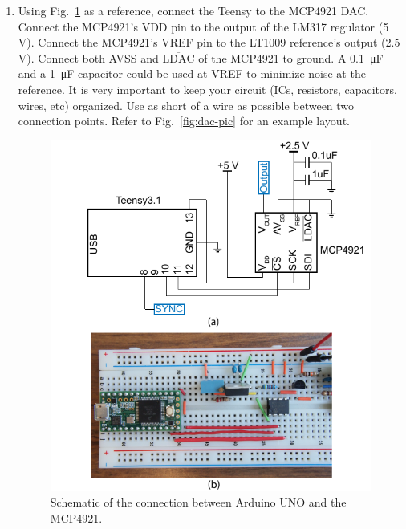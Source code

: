\documentclass[letterpaper, 11pt]{article}
\begin{document}
\begin{enumerate}
	\item Using Fig.~\ref{fig:dac-sch} as a reference, connect the Teensy to the MCP4921 DAC. Connect the MCP4921's VDD pin to the output of the LM317 regulator (5\,V). Connect the MCP4921's VREF pin to the LT1009 reference's output (2.5\,V). Connect both AVSS and $\overline{\text{LDAC}}$ of the MCP4921 to ground. A \SI{0.1}{\micro\farad} and a \SI{1}{\micro\farad} capacitor could be used at VREF to minimize noise at the reference. It is very important to keep your circuit (ICs, resistors, capacitors, wires, etc) organized. Use as short of a wire as possible between two connection points. Refer to Fig.~\ref{fig:dac-pic} for an example layout.
	
	\begin{figure}[h]
		\centering
		\includegraphics{dac-sch}
		\caption{Schematic of the connection between Arduino UNO and the MCP4921.}
		\label{fig:dac-sch}
	\end{figure}



\end{enumerate}
\end{document}
